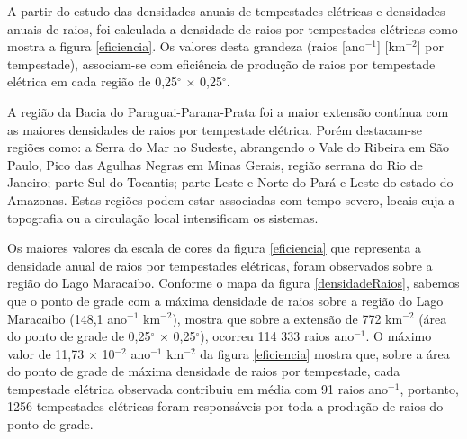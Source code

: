 
A partir do estudo das densidades anuais de tempestades elétricas e densidades anuais de raios, foi calculada a densidade de raios por tempestades elétricas como mostra a figura \ref{eficiencia}. Os valores desta grandeza (raios [ano$^{-1}$] [km$^{-2}$] por tempestade), associam-se com eficiência de produção de raios por tempestade elétrica em cada região de 0,25$^{\circ}$ $\times$ 0,25$^{\circ}$.

A região da Bacia do Paraguai-Parana-Prata foi a maior extensão contínua com as maiores densidades de raios por tempestade elétrica. Porém destacam-se regiões como: a Serra do Mar no Sudeste, abrangendo o Vale do Ribeira em São Paulo, Pico das Agulhas Negras em Minas Gerais, região serrana do Rio de Janeiro; parte Sul do Tocantis; parte Leste e Norte do Pará e Leste do estado do Amazonas. Estas regiões podem estar associadas com tempo severo, locais cuja a topografia ou a circulação local intensificam os sistemas.

Os maiores valores da escala de cores da figura \ref{eficiencia} que representa a densidade anual de raios por tempestades elétricas, foram observados sobre a região do Lago Maracaibo. Conforme o mapa da figura \ref{densidadeRaios}, sabemos que o ponto de grade com a máxima densidade de raios sobre a região do Lago Maracaibo (148,1 ano$^{-1}$ km$^{-2}$), mostra que sobre a extensão de 772 km$^{-2}$ (área do ponto de grade de  0,25$^{\circ}$ $\times$ 0,25$^{\circ}$), ocorreu {114 333} raios ano$^{-1}$. O máximo valor de  11,73 $\times$ 10$^{-2}$ ano$^{-1}$ km$^{-2}$ da figura \ref{eficiencia} mostra que, sobre a área do ponto de grade de máxima densidade de raios por tempestade, cada tempestade elétrica observada contribuiu em média com 91 raios ano$^{-1}$, portanto, 1256 tempestades elétricas foram responsáveis por toda a produção de raios do ponto de grade.  



